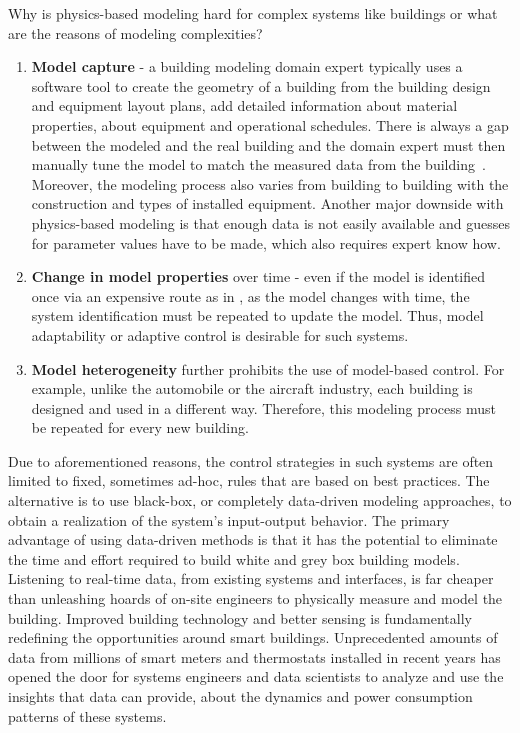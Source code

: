 Why is physics-based modeling hard for complex systems like buildings or what are the reasons of modeling complexities?
\begin{enumerate}
	\item \textbf{Model capture} - a building modeling domain expert typically uses a software tool to create the geometry of a building from the building design and equipment layout plans, add detailed information about material properties, about equipment and operational schedules. There is always a gap between the modeled and the real building and the domain expert must then manually tune the model to match the measured data from the building~\cite{New2012}. 
Moreover, the modeling process also varies from building to building with the construction and types of installed equipment.
Another major downside with physics-based modeling is that enough data is not easily available and guesses for parameter values have to be made, which also requires expert know how.

\item \textbf{Change in model properties} over time - even if the model is identified once via an expensive route as in \cite{Sturzenegger2016}, as the model changes with time, the system identification must be repeated to update the model. Thus, model adaptability or adaptive control is desirable for such systems. 

\item \textbf{Model heterogeneity} further prohibits the use of model-based control. For example, unlike the automobile or the aircraft industry, each building is designed and used in a different way. Therefore, this modeling process must be repeated for every new building. 
\end{enumerate}

Due to aforementioned reasons, the control strategies in such systems are often limited to fixed, sometimes ad-hoc, rules that are based on best practices. 
The alternative is to use black-box, or completely data-driven modeling approaches, to obtain a realization of the system's input-output behavior. 
The primary advantage of using data-driven methods is that it has the potential to eliminate the time and effort required to build white and grey box building models. 
Listening to real-time data, from existing systems and interfaces, is far cheaper than unleashing hoards of on-site engineers to physically measure and model the building. Improved building technology and better sensing is fundamentally redefining the opportunities around smart buildings. 
Unprecedented amounts of data from millions of smart meters and thermostats installed in recent years has opened the door for systems engineers and data scientists to analyze and use the insights that data can provide, about the dynamics and power consumption patterns of these systems. 

